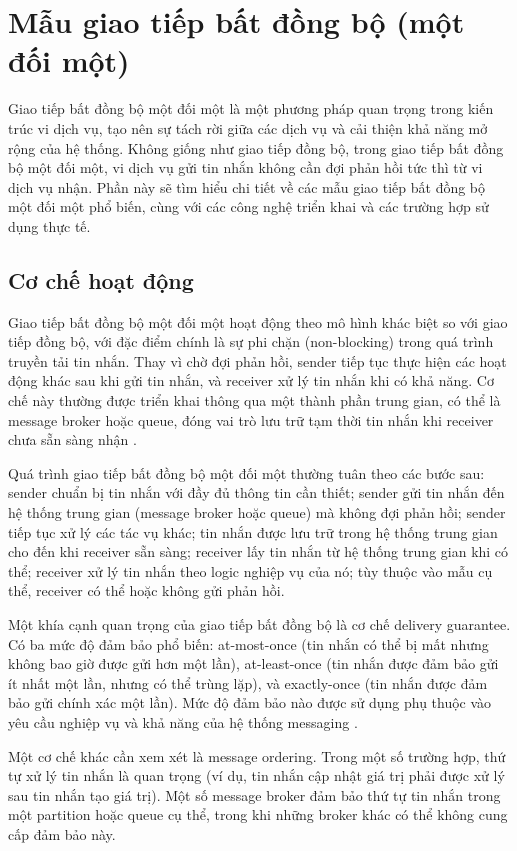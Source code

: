 \section{Mẫu giao tiếp bất đồng bộ (một đối một)}
Giao tiếp bất đồng bộ một đối một là một phương pháp quan trọng trong kiến trúc vi dịch vụ, tạo nên sự tách rời giữa các dịch vụ và cải thiện khả năng mở rộng của hệ thống. Không giống như giao tiếp đồng bộ, trong giao tiếp bất đồng bộ một đối một, vi dịch vụ gửi tin nhắn không cần đợi phản hồi tức thì từ vi dịch vụ nhận. Phần này sẽ tìm hiểu chi tiết về các mẫu giao tiếp bất đồng bộ một đối một phổ biến, cùng với các công nghệ triển khai và các trường hợp sử dụng thực tế.

\subsection{Cơ chế hoạt động}
Giao tiếp bất đồng bộ một đối một hoạt động theo mô hình khác biệt so với giao tiếp đồng bộ, với đặc điểm chính là sự phi chặn (non-blocking) trong quá trình truyền tải tin nhắn. Thay vì chờ đợi phản hồi, sender tiếp tục thực hiện các hoạt động khác sau khi gửi tin nhắn, và receiver xử lý tin nhắn khi có khả năng. Cơ chế này thường được triển khai thông qua một thành phần trung gian, có thể là message broker hoặc queue, đóng vai trò lưu trữ tạm thời tin nhắn khi receiver chưa sẵn sàng nhận \cite{hohpe2004}.

Quá trình giao tiếp bất đồng bộ một đối một thường tuân theo các bước sau: sender chuẩn bị tin nhắn với đầy đủ thông tin cần thiết; sender gửi tin nhắn đến hệ thống trung gian (message broker hoặc queue) mà không đợi phản hồi; sender tiếp tục xử lý các tác vụ khác; tin nhắn được lưu trữ trong hệ thống trung gian cho đến khi receiver sẵn sàng; receiver lấy tin nhắn từ hệ thống trung gian khi có thể; receiver xử lý tin nhắn theo logic nghiệp vụ của nó; tùy thuộc vào mẫu cụ thể, receiver có thể hoặc không gửi phản hồi.

Một khía cạnh quan trọng của giao tiếp bất đồng bộ là cơ chế delivery guarantee. Có ba mức độ đảm bảo phổ biến: at-most-once (tin nhắn có thể bị mất nhưng không bao giờ được gửi hơn một lần), at-least-once (tin nhắn được đảm bảo gửi ít nhất một lần, nhưng có thể trùng lặp), và exactly-once (tin nhắn được đảm bảo gửi chính xác một lần). Mức độ đảm bảo nào được sử dụng phụ thuộc vào yêu cầu nghiệp vụ và khả năng của hệ thống messaging \cite{newman2015}.

Một cơ chế khác cần xem xét là message ordering. Trong một số trường hợp, thứ tự xử lý tin nhắn là quan trọng (ví dụ, tin nhắn cập nhật giá trị phải được xử lý sau tin nhắn tạo giá trị). Một số message broker đảm bảo thứ tự tin nhắn trong một partition hoặc queue cụ thể, trong khi những broker khác có thể không cung cấp đảm bảo này.


